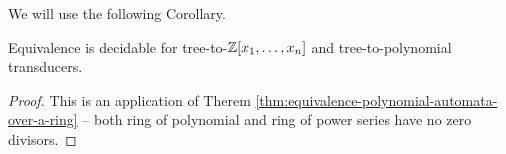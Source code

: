 We will use the following Corollary.
\begin{corollary}\label{cor:equivalence-pol-transducers-Zrat}
	Equivalence is decidable for tree-to-$\mathbb{Z}[x_{1}, \ldots, x_{n}]$ and tree-to-\Zrat polynomial transducers.
\end{corollary}
\begin{proof}
	This is an application of Therem \ref{thm:equivalence-polynomial-automata-over-a-ring} -- both ring of polynomial and ring of power series have no zero divisors.
\end{proof}
